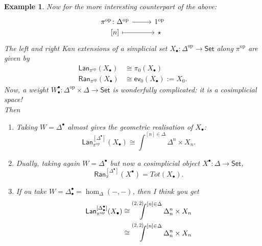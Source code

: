 \documentclass[11pt]{amsart}
\def\defeq{:=}
\newcommand*{\Scale}[2][4]{\scalebox{#1}{\ensuremath{#2}}}%
\newcommand{\wLan}[1]{\mathsf{Lan}^{\left[#1\right]}}
\newcommand{\wRan}[1]{\mathsf{Ran}^{\left[#1\right]}}
\newcommand{\ev}{\mathsf{ev}}
\newcommand{\Lan}{\mathsf{Lan}}
\newcommand{\Ran}{\mathsf{Ran}}
\newcommand{\pqCoend}[3]{%
  \mathchoice
    {\mathop{\prescript{\Scale[.75]{\raisebox{-.25em}{$(#1,#2)$}}\kern-.625em}{}{\int^{#3}}}}
    {\mathop{\prescript{\Scale[.75]{\raisebox{-.25em}{$(#1,#2)$}}\kern-.25em}{}{\int^{#3}}}}
    {\mathop{\prescript{\Scale[.75]{\raisebox{-.25em}{$(#1,#2)$}}\kern-.25em}{}{\int^{#3}}}}
    {\mathop{\prescript{\Scale[.75]{\raisebox{-.25em}{$(#1,#2)$}}\kern-.25em}{}{\int^{#3}}}}
  }
\newtheorem{example}{Example}
\def\op{\text{op}}
\begin{document}
\begin{example}
	Now for the more interesting counterpart of the above:
	\[
		\begin{tikzcd}[row sep=0.0em, column sep=2.7em,  ampersand replacement=\&]
			 \pi^{\op}\colon \Delta^{\op}
			\arrow[r]
			\&
			1^{\op}
			\\
			{[n]}
			\arrow[r, mapsto]
			\&
			{\star}
		\end{tikzcd}
	\]%
	The left and right Kan extensions of a simplicial set $X_{\bullet}\colon\Delta^\op\longrightarrow\textsf{Set}$ along $\pi^{\op}$ are given by
	\begin{align*}
		\Lan_{\pi^{\op}}(X_{\bullet}) & \cong \pi_{0}(X_{\bullet})               \\
		\Ran_{\pi^{\op}}(X_{\bullet}) & \cong \ev_{0}(X_{\bullet}) \defeq X_{0}.
	\end{align*}
	Now, a weight $W^{\bullet}_{\bullet}\colon\Delta^{\op}\times\Delta\longrightarrow\textsf{Set}$ is wonderfully complicated: it is a cosimplicial space!
	\[
	\]
	Then
	\begin{enumerate}
		\item Taking $W=\Delta^{\bullet}$ almost gives the geometric realisation of $X_{\bullet}$:
		      \[
			      \wLan{\Delta^{\bullet}}_{\pi^{\op}}(X_{\bullet}) \cong \int^{[n]\in\Delta}\Delta^{n}\times X_{n}.
		      \]
		\item Dually, taking again $W=\Delta^{\bullet}$ but now a cosimplicial object $X^{\bullet}\colon\Delta\longrightarrow\textsf{Set}$,
		      \[
			      \wRan{\Delta^{\bullet}}_{\pi}(X^{\bullet}) = Tot(X_{\bullet}).
		      \]
		\item If ou take $W=\Delta^{\bullet}_{\bullet}=\hom_{\Delta}(-,-)$, then I think you get
		      \begin{align*}
			      \wLan{\Delta^{\bullet}_{\bullet}}_{\pi^{\op}}(X_{\bullet}) & \cong \pqCoend{2}{2}{[n]\in\Delta}\Delta^{n}_{n}\times X_{n} \\
			                                                                 & \cong \pqCoend{2}{2}{[n]\in\Delta}\Delta^{n}_{n}\times X_{n}
		      \end{align*}
	\end{enumerate}
\end{example}
\end{document}
